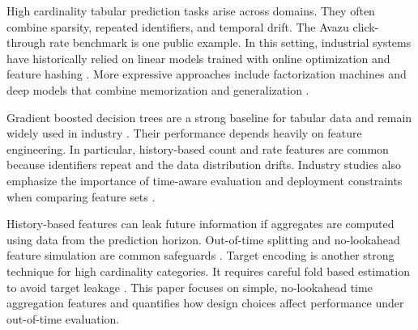 High cardinality tabular prediction tasks arise across domains.
They often combine sparsity, repeated identifiers, and temporal drift.
The Avazu click-through rate benchmark is one public example.
In this setting, industrial systems have historically relied on linear models trained with online optimization and feature hashing \citep{mcmahan2013ad}.
More expressive approaches include factorization machines and deep models that combine memorization and generalization \citep{rendle2010factorization,cheng2016wide,guo2017deepfm}.

Gradient boosted decision trees are a strong baseline for tabular data and remain widely used in industry \citep{friedman2001greedy,chen2016xgboost}.
Their performance depends heavily on feature engineering.
In particular, history-based count and rate features are common because identifiers repeat and the data distribution drifts.
Industry studies also emphasize the importance of time-aware evaluation and deployment constraints when comparing feature sets \citep{he2014practical}.

History-based features can leak future information if aggregates are computed using data from the prediction horizon.
Out-of-time splitting and no-lookahead feature simulation are common safeguards \citep{he2014practical}.
Target encoding is another strong technique for high cardinality categories.
It requires careful fold based estimation to avoid target leakage \citep{micci2001preprocessing}.
This paper focuses on simple, no-lookahead time aggregation features and quantifies how design choices affect performance under out-of-time evaluation.
